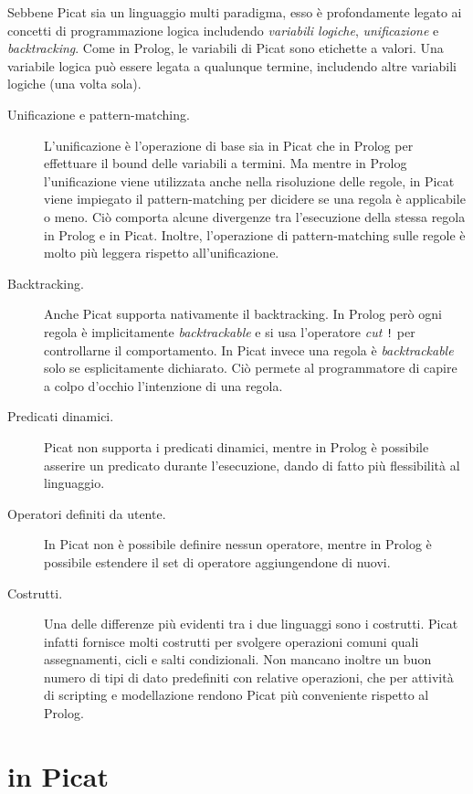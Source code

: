 \documentclass[12pt,a4paper,openright]{book} %
\begin{document}
Sebbene Picat sia un linguaggio multi paradigma, esso è profondamente legato ai concetti di programmazione logica includendo \emph{variabili logiche}, \emph{unificazione} e \emph{backtracking}.
Come in Prolog, le variabili di Picat sono etichette a valori. Una variabile logica può essere legata a qualunque termine, includendo altre variabili logiche (una volta sola).

\begin{description}
\item[Unificazione e pattern-matching.] L'unificazione è l'operazione di base sia in Picat che in Prolog per effettuare il bound delle variabili a termini. Ma mentre in Prolog l'unificazione viene utilizzata anche nella risoluzione delle regole, in Picat viene impiegato il pattern-matching per dicidere se una regola è applicabile o meno. Ciò comporta alcune divergenze tra l'esecuzione della stessa regola in Prolog e in Picat.
Inoltre, l'operazione di pattern-matching sulle regole è molto più leggera rispetto all'unificazione.
\item[Backtracking.] Anche Picat supporta nativamente il backtracking. In Prolog però ogni regola è implicitamente \emph{backtrackable} e si usa l'operatore \emph{cut} \verb|!| per controllarne il comportamento. In Picat invece una regola è \emph{backtrackable} solo se esplicitamente dichiarato. Ciò permete al programmatore di capire a colpo d'occhio l'intenzione di una regola.
\item[Predicati dinamici.] Picat non supporta i predicati dinamici, mentre in Prolog è possibile asserire un predicato durante l'esecuzione, dando di fatto più flessibilità al linguaggio.
\item[Operatori definiti da utente.] In Picat non è possibile definire nessun operatore, mentre in Prolog è possibile estendere il set di operatore aggiungendone di nuovi.
\item[Costrutti.] Una delle differenze più evidenti tra i due linguaggi sono i costrutti. Picat infatti fornisce molti costrutti per svolgere operazioni comuni quali assegnamenti, cicli e salti condizionali. Non mancano inoltre un buon numero di tipi di dato predefiniti con relative operazioni, che per attività di scripting e modellazione rendono Picat più conveniente rispetto al Prolog.
\end{description}


\chapter{\lset{} in Picat}
\label{ch:lsetpicat}
\end{document}
